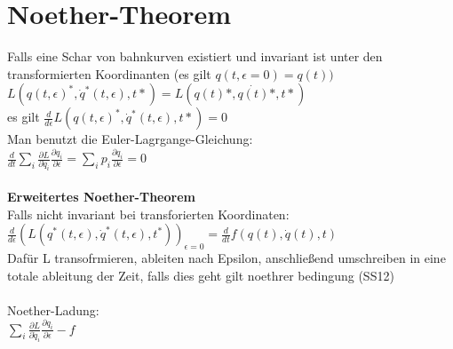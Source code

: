 \documentclass[10pt,a4paper]{article}
\begin{document}
\section{Noether-Theorem}
Falls eine Schar von bahnkurven existiert und invariant ist unter den transformierten Koordinanten (es gilt $q(t,\epsilon=0)=q(t))$\\
%
$L(q(t,\epsilon)^*,\dot{q}^*(t,\epsilon),t*)  =  L(q(t)*,\dot{q(t)}*,t*)$\\
es gilt $\frac{d}{d \epsilon} L(q(t,\epsilon)^*,\dot{q}^*(t,\epsilon),t*)=0$\\
Man benutzt die Euler-Lagrgange-Gleichung:\\
$\frac{d}{dt}\sum_i \frac{\partial{L}}{\partial \dot{q}_i} \frac{\partial{q_i}}{\partial \epsilon} = \sum_i p_i \frac{\partial{q_i}}{\partial \epsilon} = 0$\\
%
\\
\textbf{Erweitertes Noether-Theorem}\\
Falls nicht invariant bei transforierten Koordinaten:\\
$\frac{d }{d \epsilon} (L(q^*(t,\epsilon),\dot{q}^*(t,\epsilon),t^*))_{\epsilon=0}  =  \frac{d }{d t} f(q(t),\dot{q}(t),t)$\\
Dafür L transofrmieren, ableiten nach Epsilon, anschließend umschreiben in eine totale ableitung der Zeit, falls dies geht gilt noethrer bedingung (SS12)\\
%
\\
Noether-Ladung:\\
$\sum_i \frac{\partial{L}}{\partial \dot{q}_i} \frac{\partial{q_i}}{\partial \epsilon
} - f$
\end{document}
